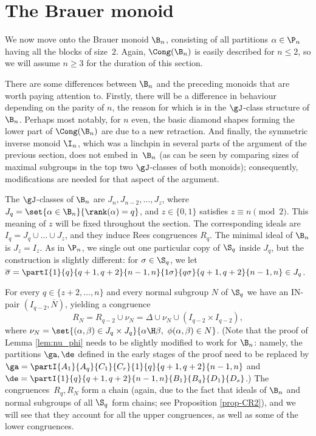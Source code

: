 \section{The Brauer monoid }
\label{sec:Bn}

We now move onto the Brauer monoid $\B_n$,
consisting of all partitions $\alpha\in\P_n$ having all the blocks of size~$2$.
Again, $\Cong(\B_n)$ is easily described for $n\leq2$, so we will assume $n\geq3$ for the duration of this section.

There are some differences between $\B_n$ and the preceding monoids that are worth paying attention to.
Firstly, there will be a difference in behaviour depending on the parity of $n$, the reason for which is in the $\gJ$-class structure of $\B_n$.
Perhaps most notably, for $n$ even, the basic diamond shapes forming the lower part of
$\Cong(\B_n)$ are due to a new retraction.
And finally, the symmetric inverse monoid $\I_n$, which was a linchpin in several parts of the argument of the previous section, does not embed in~$\B_n$ (as can be seen by comparing sizes of maximal subgroups in the top two $\gJ$-classes of both monoids); consequently, modifications are needed for that aspect of the argument.

The $\gJ$-classes of $\B_n$ are $J_n,J_{n-2},\dots,J_z$,
where $J_q=\set{\alpha\in\B_n}{ \rank(\alpha)=q}$, and  $z\in\{0,1\}$ satisfies
$z\equiv n \pmod{2}$.
This meaning of $z$ will be fixed throughout the section.
The corresponding ideals are $I_q=J_q\cup\dots\cup J_z$, and they induce Rees congruences
$R_q$.
The minimal ideal of $\B_n$ is $J_z=I_z$.
As in $\P_n$, we single out one particular copy of $\S_q$ inside $J_q$, but the construction is slightly different:
for $\sigma\in\S_q$, we let $\overline{\sigma}=\partI{1}{q}{q+1,q+2}{n-1,n}{1\sigma}{q\sigma}{q+1,q+2}{n-1,n}\in J_q$.

For every $q\in\{z+2,\dots,n\}$ and every normal subgroup $N$ of $\S_q$ we have an IN-pair $(I_{q-2},\overline{N})$, yielding a congruence
\[
R_N=R_{q-2}\cup\nu_N=\Delta\cup\nu_N\cup (I_{q-2}\times I_{q-2}),
\]
where $\nu_N=\set{ (\alpha,\beta)\in J_q\times J_q}{ \alpha\H\beta,\ \phi(\alpha,\beta)\in N}$.
%
(Note that the proof of Lemma \ref{lem:nu_phi} needs to be slightly modified to work for $\B_n$: namely, the partitions $\ga,\de$ defined in the early stages of the proof need to be replaced by $\ga=\partI{A_1}{A_q}{C_1}{C_r}{1}{q}{q+1,q+2}{n-1,n}$ and $\de=\partI{1}{q}{q+1,q+2}{n-1,n}{B_1}{B_q}{D_1}{D_s}$.)
%
The congruences~$R_q,R_N$ form a chain (again, due to the fact that ideals of $\B_n$ and normal subgroups of all $\S_q$ form chains; see Proposition \ref{prop-CR2}), and we will see that they account for all the upper congruences, as well as some of the lower congruences.


